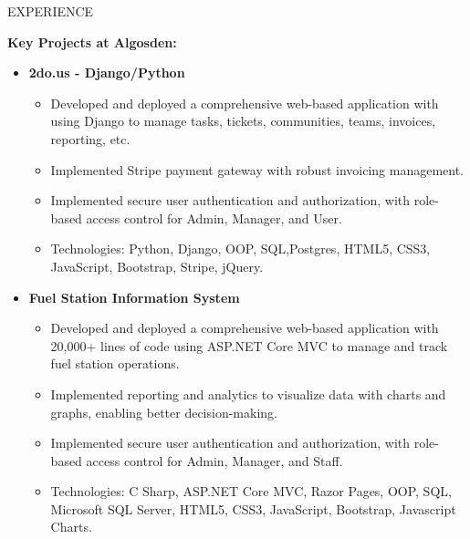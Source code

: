 \documentclass{resume} %
\begin{document}
\begin{rSection}{EXPERIENCE}
\begin{itemize}
		\textbf{Key Projects at Algosden:}
			\begin{itemize}
			\itemsep -3pt {} 
			\item \textbf{2do.us - Django/Python}
			
				\begin{itemize}
					\itemsep -3pt {} 
					\item Developed and deployed a comprehensive web-based application with using Django to manage tasks, tickets, communities, teams, invoices, reporting, etc.
					\item Implemented Stripe payment gateway with robust invoicing management.
					
					\item Implemented secure user authentication and authorization, with role-based access control for Admin, Manager, and User.
					\item Technologies: Python, Django, OOP, SQL,Postgres, HTML5, CSS3, JavaScript, Bootstrap, Stripe, jQuery.
				\end{itemize}
			\end{itemize}
		\begin{itemize}
			\itemsep -3pt {} 
			\item \textbf{Fuel Station Information System}
			
			\begin{itemize}
				\itemsep -3pt {} 
				\item Developed and deployed a comprehensive web-based application with 20,000+ lines of code using ASP.NET Core MVC to manage and track fuel station operations.
				\item Implemented reporting and analytics to visualize data with charts and graphs, enabling better decision-making.
				
				\item Implemented secure user authentication and authorization, with role-based access control for Admin, Manager, and Staff.
				\item Technologies: C Sharp, ASP.NET Core MVC, Razor Pages, OOP, SQL, Microsoft SQL Server, HTML5, CSS3, JavaScript, Bootstrap, Javascript Charts.
			\end{itemize}
		\end{itemize}
	
		 
	\end{itemize}
	

\end{rSection}
\end{document}
